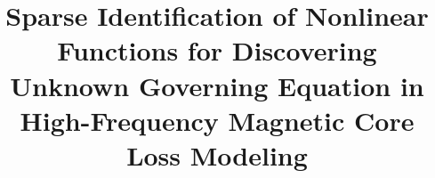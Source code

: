 \documentclass[pdftex,10pt,oneside,letter]{article}
\begin{document}
\title {\large  \bf \vspace{-8ex}
Sparse Identification of Nonlinear Functions for Discovering Unknown Governing Equation in High-Frequency Magnetic Core Loss Modeling  
\vspace{-10ex}}
\date{}
\maketitle
\thispagestyle{empty}
\pagestyle{empty}

\renewcommand{\figurename}{Fig.}









{\vspace{\baselineskip}


}
\end{document}

